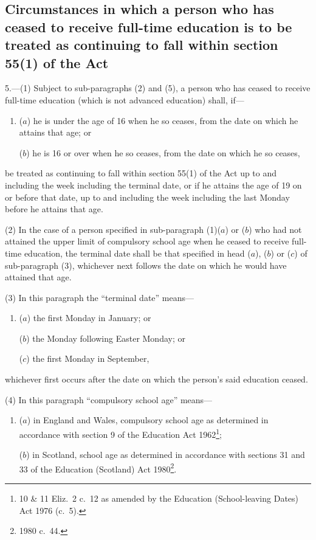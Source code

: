 \documentclass[12pt,a4paper]{article}
\begin{document}
\subsection*{Circumstances in which a person who has ceased to receive full-time education is to be treated as continuing to fall within section 55(1) of the Act}

5.---(1)  Subject to sub-paragraphs (2) and (5), a person who has ceased to receive full-time education (which is not advanced education) shall, if—
\begin{enumerate}\item[]
($a$) he is under the age of 16 when he so ceases, from the date on which he attains that age; or

($b$) he is 16 or over when he so ceases, from the date on which he so ceases,
\end{enumerate}
be treated as continuing to fall within section 55(1) of the Act up to and including the week including the terminal date, or if he attains the age of 19 on or before that date, up to and including the week including the last Monday before he attains that age.

(2) In the case of a person specified in sub-paragraph (1)($a$)  or ($b$)  who had not attained the upper limit of compulsory school age when he ceased to receive full-time education, the terminal date shall be that specified in head ($a$), ($b$)  or ($c$)  of sub-paragraph (3), whichever next follows the date on which he would have attained that age.

(3) In this paragraph the “terminal date” means—
\begin{enumerate}\item[]
($a$) the first Monday in January; or

($b$) the Monday following Easter Monday; or

($c$) the first Monday in September,
\end{enumerate}
whichever first occurs after the date on which the person’s said education ceased.

(4) In this paragraph “compulsory school age” means—
\begin{enumerate}\item[]
($a$) in England and Wales, compulsory school age as determined in accordance with section 9 of the Education Act 1962\footnote{10 \& 11 Eliz.\ 2 c.\ 12 as amended by the Education (School-leaving Dates) Act 1976 (c.\ 5).};

($b$) in Scotland, school age as determined in accordance with sections 31 and 33 of the Education (Scotland) Act 1980\footnote{1980 c.\ 44.}.
\end{enumerate}
\end{document}
